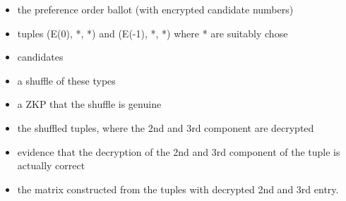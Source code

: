 \documentclass{llncs}
\begin{document}
\begin{itemize}
\item the preference order ballot (with encrypted candidate numbers)
\item tuples (E(0), *, *) and (E(-1), *, *) where * are suitably chose
\item candidates
\item a shuffle of these types
\item a ZKP that the shuffle is genuine
\item the shuffled tuples, where the 2nd and 3rd component are decrypted
\item evidence that the decryption of the 2nd and 3rd component of the
      tuple is actually correct
\item the matrix constructed from the tuples with decrypted 2nd and 3rd
      entry.
     
      
\end{itemize}
\end{document}
